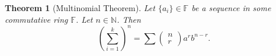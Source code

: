 \documentclass[12pt]{article}
\newtheorem*{theorem}{Theorem}
\begin{document}
    \begin{theorem}[Multinomial Theorem]
        Let $\{a_i\}\in\mathbb{F}$ be a sequence in some commutative ring $\mathbb{F}$. Let $n\in\mathbb{N}$. Then \[(\sum_{i=1}^{k})^n=\sum_{}\begin{pmatrix}
            n\\r
        \end{pmatrix}a^r b^{n-r}.\]
    \end{theorem}
\end{document}
